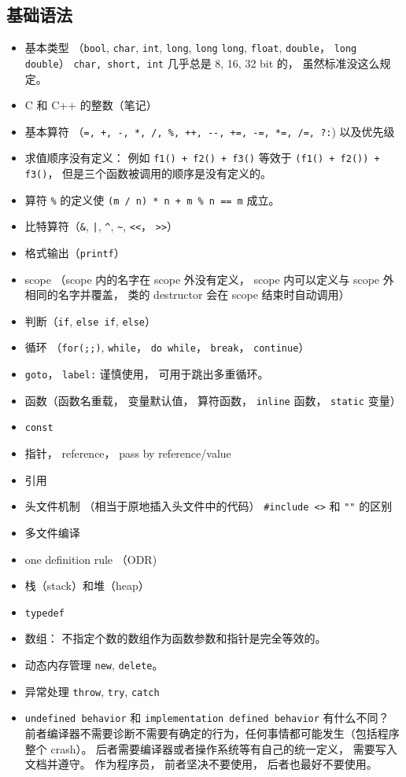 \subsection{基础语法}
\begin{itemize}
\item 基本类型 （\verb|bool|, \verb|char|, \verb|int|, \verb|long|, \verb|long| \verb|long|, \verb|float|, \verb|double|， \verb|long double|） \verb|char, short, int| 几乎总是 8, 16, 32 bit 的， 虽然标准没这么规定。
\item C 和 C++ 的整数（笔记）
\item 基本算符 （\verb|=, +, -, *, /, %, ++, --, +=, -=, *=, /=, ?:|) 以及优先级
\item 求值顺序没有定义： 例如 \verb|f1() + f2() + f3()| 等效于 \verb|(f1() + f2()) + f3()|， 但是三个函数被调用的顺序是没有定义的。
\item 算符 \verb|%| 的定义使 \verb|(m / n) * n + m % n == m| 成立。
\item 比特算符（\verb|&|, \verb+|+, \verb|^|, \verb|~|, \verb|<<|， \verb|>>|）
\item 格式输出（\verb|printf|）
\item scope （scope 内的名字在 scope 外没有定义， scope 内可以定义与 scope 外相同的名字并覆盖， 类的 destructor 会在 scope 结束时自动调用）
\item 判断（\verb|if|, \verb|else if|, \verb|else|）
\item 循环 （\verb|for(;;)|, \verb|while|， \verb|do while|， \verb|break|， \verb|continue|）
\item \verb|goto|， \verb|label:| 谨慎使用， 可用于跳出多重循环。
\item 函数（函数名重载， 变量默认值， 算符函数， \verb|inline| 函数， \verb|static| 变量）
\item \verb|const|
\item 指针， reference， pass by reference/value
\item 引用
\item 头文件机制 （相当于原地插入头文件中的代码） \verb|#include <>| 和 \verb|""| 的区别
\item 多文件编译
\item one definition rule （ODR)
\item 栈（stack）和堆（heap）
\item \verb|typedef|
\item 数组： 不指定个数的数组作为函数参数和指针是完全等效的。
\item 动态内存管理 \verb|new|, \verb|delete|。
\item 异常处理 \verb|throw|, \verb|try|, \verb|catch|
\item \verb|undefined behavior| 和 \verb|implementation defined behavior| 有什么不同？ 前者编译器不需要诊断不需要有确定的行为，任何事情都可能发生（包括程序整个 crash）。 后者需要编译器或者操作系统等有自己的统一定义， 需要写入文档并遵守。 作为程序员， 前者坚决不要使用， 后者也最好不要使用。
\end{itemize}

